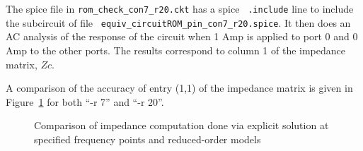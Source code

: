 The spice file in {\tt rom\_check\_con7\_r20.ckt} has a spice {\tt
  .include} line to include the subcircuit of file {\tt
  equiv\_circuitROM\_pin\_con7\_r20.spice}.  It then does an AC analysis
of the response of the circuit when 1 Amp is applied to port 0 and 0
Amp to the other ports.  The results correspond to column 1 of the
impedance matrix, $Zc$. 

A comparison of the accuracy of entry (1,1) of the impedance matrix is
given in Figure~\ref{rom-fig} for both ``-r 7'' and
``-r 20''. 

\begin{figure}
\centerline{
}
\caption{Comparison of impedance computation done via explicit
  solution at specified frequency points and reduced-order models}
\label{rom-fig}
\end{figure}


